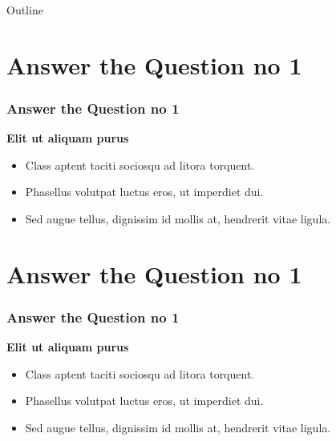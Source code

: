 \documentclass{beamer}
\begin{document}
\begin{frame}{Outline}
  \tableofcontents
\end{frame}

\section{Answer the Question no 1}
\begin{frame}
\frametitle{Answer the Question no 1}
\begin{flushleft}
\textbf{Elit ut aliquam purus}
\begin{itemize}
    \item Class aptent taciti sociosqu ad litora torquent.
    \item Phasellus volutpat luctus eros, ut imperdiet dui.
    \item Sed augue tellus, dignissim id mollis at, hendrerit vitae ligula.
\end{itemize}
\end{flushleft}
\end{frame}

\section{Answer the Question no 1}
\begin{frame}
\frametitle{Answer the Question no 1}
\begin{flushleft}
\textbf{Elit ut aliquam purus}
\begin{itemize}
    \item Class aptent taciti sociosqu ad litora torquent.
    \item Phasellus volutpat luctus eros, ut imperdiet dui.
    \item Sed augue tellus, dignissim id mollis at, hendrerit vitae ligula.
\end{itemize}
\end{flushleft}
\end{frame}
\end{document}
